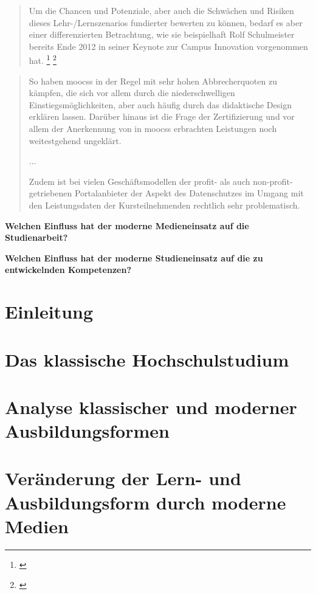 \documentclass[150]{HSMW-Thesis}
\begin{document}
\begin{quote}
Um  die  Chancen  und  Potenziale,  aber  auch  die  Schwächen  und  Risiken  dieses Lehr-/Lernszenarios fundierter bewerten zu können, bedarf es aber einer differenzierten 
Betrachtung, wie sie beispielhaft Rolf Schulmeister bereits Ende 2012 in seiner Keynote zur  Campus  Innovation  vorgenommen  hat. \footnote{\cite[S. 7 ff.]{Schulmeister2013} } \footnote{\cite{digitalkompakt07}}
\end{quote}

\begin{quote}
So haben \glspl{moocs} in der Regel mit sehr hohen Abbrecherquoten zu kämpfen, die sich vor allem durch die niederschwelligen Einstiegsmöglichkeiten, 
aber auch häufig durch das didaktische Design erklären lassen. Darüber hinaus ist die Frage der Zertifizierung und vor allem der Anerkennung von in \glspl{moocs} erbrachten Leistungen 
noch weitestgehend ungeklärt. 

... 

Zudem ist bei vielen Geschäftsmodellen der profit- als auch non-profit-getriebenen Portalanbieter der Aspekt des Datenschutzes 
im Umgang mit den Leistungsdaten der Kursteilnehmenden rechtlich sehr problematisch.
\end{quote} 

\textbf{Welchen Einfluss hat der moderne Medieneinsatz auf die Studienarbeit?}

\textbf{Welchen Einfluss hat der moderne Studieneinsatz auf die zu entwickelnden Kompetenzen?}

\chapter{Einleitung}

\chapter{Das klassische Hochschulstudium}

\chapter{Analyse klassischer und moderner Ausbildungsformen}

\chapter{Veränderung der Lern- und Ausbildungsform durch moderne Medien}
\end{document}
